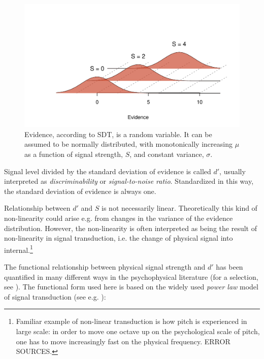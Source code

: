 \documentclass{article}\usepackage{knitr}
\begin{document}
\begin{figure}[!htb]
\begin{center}
\begin{knitrout}
\color{fgcolor}
\includegraphics[width=\maxwidth]{figure/unnamed-chunk-2-1} 

\end{knitrout}
\end{center}
\caption{Evidence, according to SDT, is a random  variable. It can be assumed to be normally distributed, with monotonically increasing $\mu$ as a function of signal strength, $S$, and constant variance, $\sigma$.}
\label{fig:SDT}
\end{figure}

Signal level divided by the standard deviation of evidence is called $d'$, usually interpreted as \textit{discriminability} or \textit{signal-to-noise ratio}. Standardized in this way, the standard deviation of evidence is always one. 

Relationship between $d'$ and $S$ is not necessarily linear. Theoretically this kind of non-linearity could  arise e.g. from changes in the variance of the evidence distribution. However, the non-linearity is often interpreted as being the result of non-linearity in signal transduction, i.e. the change of physical signal into internal.\footnote{Familiar example of non-linear transduction is how pitch is experienced in large scale: in order to move one octave up on the psychological scale of pitch, one has to move increasingly fast on the physical frequency. ERROR SOURCES.}

The functional relationship between physical signal strength and $d'$ has been quantified in many different ways in the psychophysical literature (for a selection, see \citet[Appendix A]{lesmes2015}). The functional form used here is based on the widely used \textit{power law} model of signal transduction (see e.g. \citet{kontsevichtyler1999, dai2011, lesmes2015}):
\end{document}
